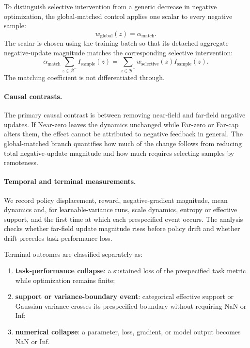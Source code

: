 To distinguish selective intervention from a generic decrease in
negative optimization, the global-matched control applies one scalar
to every negative sample:
\begin{equation}
    w_{\mathrm{global}}(z)
    =
    \alpha_{\mathrm{match}}.
    \label{eq:causal_global_weight}
\end{equation}
The scalar is chosen using the training batch so that its detached aggregate
negative-update magnitude matches the corresponding selective
intervention:
\begin{equation}
    \alpha_{\mathrm{match}}
    \sum_{z\in\mathcal B^-}
        I_{\mathrm{sample}}(z)
    =
    \sum_{z\in\mathcal B^-}
        w_{\mathrm{selective}}(z)
        I_{\mathrm{sample}}(z).
    \label{eq:causal_budget_match}
\end{equation}
The matching coefficient is not differentiated through.

\paragraph{Causal contrasts.}
The primary causal contrast is between removing near-field and
far-field negative updates. If Near-zero leaves the dynamics unchanged
while Far-zero or Far-cap alters them, the effect cannot be attributed
to negative feedback in general. The global-matched branch quantifies
how much of the change follows from reducing total negative-update magnitude
and how much requires selecting samples by remoteness.

\paragraph{Temporal and terminal measurements.}
We record policy displacement, reward, negative-gradient magnitude,
mean dynamics and, for learnable-variance runs, scale dynamics, entropy or effective support, and the first
time at which each prespecified event occurs. The analysis checks whether
far-field update magnitude rises before policy drift and whether drift precedes
task-performance loss.

Terminal outcomes are classified separately as:

\begin{enumerate}
    \item \textbf{task-performance collapse}: a sustained loss of the
    prespecified task metric while optimization remains finite;
    \item \textbf{support or variance-boundary event}: categorical
    effective support or Gaussian variance crosses its prespecified
    boundary without requiring NaN or Inf;
    \item \textbf{numerical collapse}: a parameter, loss, gradient, or
    model output becomes NaN or Inf.
\end{enumerate}

